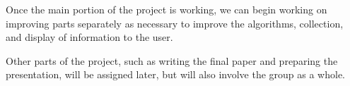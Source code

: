 \documentclass{acm_proc_article-sp}
\begin{document}
Once the main portion of the project is working, we can begin working on improving parts
separately as necessary to improve the algorithms, collection, and display of information
to the user.

Other parts of the project, such as writing the final paper and preparing the presentation,
will be assigned later, but will also involve the group as a whole.


%

%
%


\end{document}
